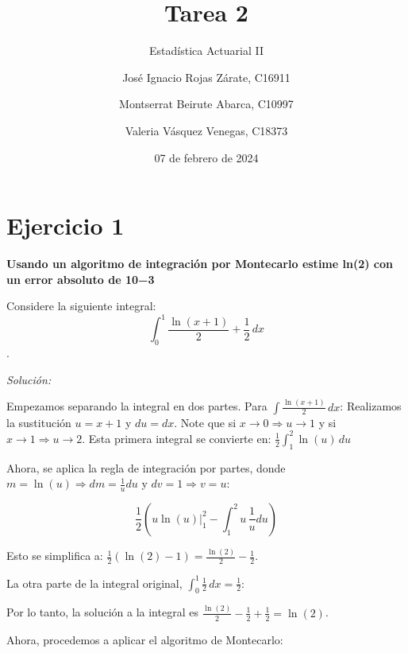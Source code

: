 \documentclass[
]{article}
\title{Tarea 2}
\subtitle{Estadística Actuarial II}
\author{José Ignacio Rojas Zárate, C16911 \and Montserrat Beirute
Abarca, C10997 \and Valeria Vásquez Venegas, C18373}
\date{07 de febrero de 2024}
\begin{document}
\maketitle

{
\setcounter{tocdepth}{2}
\tableofcontents
}
\newpage

\hypertarget{ejercicio-1}{%
\section{Ejercicio 1}\label{ejercicio-1}}

\textbf{Usando un algoritmo de integración por Montecarlo estime ln(2)
con un error absoluto de 10−3}

Considere la siguiente integral:
\[ \int_{0}^{1} \frac{\ln(x + 1)}{2} + \frac{1}{2} \, dx \].

\emph{Solución:}

Empezamos separando la integral en dos partes. Para
\(\int \frac{\ln(x + 1)}{2} \, dx\): Realizamos la sustitución
\(u = x + 1\) y \(du = dx\). Note que si
\(x \rightarrow 0 \Rightarrow u \rightarrow 1\) y si
\(x \rightarrow 1 \Rightarrow u \rightarrow 2\). Esta primera integral
se convierte en: \(\frac{1}{2} \int_{1}^{2} \ln(u) \, du\)

Ahora, se aplica la regla de integración por partes, donde
\(m = \ln(u) \Rightarrow dm = \frac{1}{u} du\) y
\(dv = 1 \Rightarrow v = u\):

\[ \frac{1}{2} \left( u \ln(u) \Big|_{1}^2 - \int_{1}^{2} u \, \frac{1}{u} du\right) \]

Esto se simplifica a:
\(\frac{1}{2} \left(\ln(2) - 1 \right) = \frac{\ln(2)}{2} - \frac{1}{2}\).

La otra parte de la integral original,
\(\int_{0}^{1} \frac{1}{2} \, dx = \frac{1}{2}\):

Por lo tanto, la solución a la integral es
\(\frac{\ln(2)}{2} - \frac{1}{2} + \frac{1}{2} = \ln(2)\).

Ahora, procedemos a aplicar el algoritmo de Montecarlo:
\end{document}
